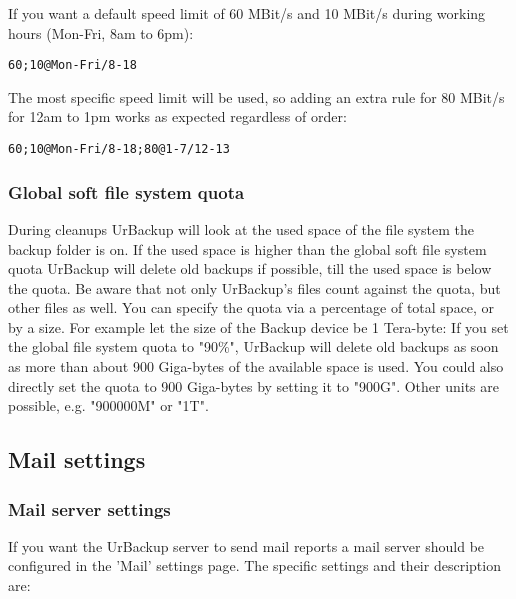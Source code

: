 \documentclass[a4paper,10pt]{article}
\begin{document}
\par\null\par
If you want a default speed limit of 60 MBit/s and 10 MBit/s during working hours (Mon-Fri, 8am to 6pm):
\begin{verbatim}
60;10@Mon-Fri/8-18
\end{verbatim}

The most specific speed limit will be used, so adding an extra rule for 80 MBit/s for 12am to 1pm works as expected regardless of order:
\begin{verbatim}
60;10@Mon-Fri/8-18;80@1-7/12-13
\end{verbatim}
 
\subsubsection{Global soft file system quota}
\label{global_soft_fs_quota}

During cleanups UrBackup will look at the used space of the file system the backup folder is on. If the used space is higher than the global soft file system quota UrBackup will delete old backups if possible, till the used space is below the quota. Be aware that not only UrBackup's files count against the quota, but other files as well.
You can specify the quota via a percentage of total space, or by a size. For example let the size of the Backup device be 1 Tera-byte:
If you set the global file system quota to "90\%", UrBackup will delete old backups as soon as more than about 900 Giga-bytes of the available space is used. You could also directly set the quota to 900 Giga-bytes by setting it to "900G". Other units are possible, e.g. "900000M" or "1T".

\subsection{Mail settings}

\subsubsection{Mail server settings}
\label{mail_server_settings}

If you want the UrBackup server to send mail reports a mail server should be configured in the 'Mail' settings page. The specific settings and their description are:
\end{document}
